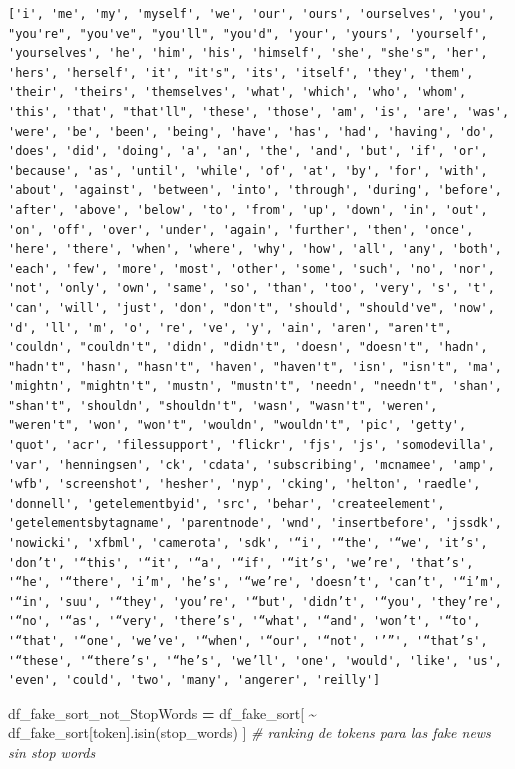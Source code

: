 \documentclass[
  11pt,
  a4paper,
]{article}
\newenvironment{Shaded}{\begin{snugshade}}{\end{snugshade}}
\newcommand{\CommentTok}[1]{\textcolor[rgb]{0.56,0.35,0.01}{\textit{#1}}}
\newcommand{\NormalTok}[1]{#1}
\newcommand{\OperatorTok}[1]{\textcolor[rgb]{0.81,0.36,0.00}{\textbf{#1}}}
\newcommand{\StringTok}[1]{\textcolor[rgb]{0.31,0.60,0.02}{#1}}
\begin{document}
\begin{verbatim}
['i', 'me', 'my', 'myself', 'we', 'our', 'ours', 'ourselves', 'you', "you're", "you've", "you'll", "you'd", 'your', 'yours', 'yourself', 'yourselves', 'he', 'him', 'his', 'himself', 'she', "she's", 'her', 'hers', 'herself', 'it', "it's", 'its', 'itself', 'they', 'them', 'their', 'theirs', 'themselves', 'what', 'which', 'who', 'whom', 'this', 'that', "that'll", 'these', 'those', 'am', 'is', 'are', 'was', 'were', 'be', 'been', 'being', 'have', 'has', 'had', 'having', 'do', 'does', 'did', 'doing', 'a', 'an', 'the', 'and', 'but', 'if', 'or', 'because', 'as', 'until', 'while', 'of', 'at', 'by', 'for', 'with', 'about', 'against', 'between', 'into', 'through', 'during', 'before', 'after', 'above', 'below', 'to', 'from', 'up', 'down', 'in', 'out', 'on', 'off', 'over', 'under', 'again', 'further', 'then', 'once', 'here', 'there', 'when', 'where', 'why', 'how', 'all', 'any', 'both', 'each', 'few', 'more', 'most', 'other', 'some', 'such', 'no', 'nor', 'not', 'only', 'own', 'same', 'so', 'than', 'too', 'very', 's', 't', 'can', 'will', 'just', 'don', "don't", 'should', "should've", 'now', 'd', 'll', 'm', 'o', 're', 've', 'y', 'ain', 'aren', "aren't", 'couldn', "couldn't", 'didn', "didn't", 'doesn', "doesn't", 'hadn', "hadn't", 'hasn', "hasn't", 'haven', "haven't", 'isn', "isn't", 'ma', 'mightn', "mightn't", 'mustn', "mustn't", 'needn', "needn't", 'shan', "shan't", 'shouldn', "shouldn't", 'wasn', "wasn't", 'weren', "weren't", 'won', "won't", 'wouldn', "wouldn't", 'pic', 'getty', 'quot', 'acr', 'filessupport', 'flickr', 'fjs', 'js', 'somodevilla', 'var', 'henningsen', 'ck', 'cdata', 'subscribing', 'mcnamee', 'amp', 'wfb', 'screenshot', 'hesher', 'nyp', 'cking', 'helton', 'raedle', 'donnell', 'getelementbyid', 'src', 'behar', 'createelement', 'getelementsbytagname', 'parentnode', 'wnd', 'insertbefore', 'jssdk', 'nowicki', 'xfbml', 'camerota', 'sdk', '“i', '“the', '“we', 'it’s', 'don’t', '“this', '“it', '“a', '“if', '“it’s', 'we’re', 'that’s', '“he', '“there', 'i’m', 'he’s', '“we’re', 'doesn’t', 'can’t', '“i’m', '“in', 'suu', '“they', 'you’re', '“but', 'didn’t', '“you', 'they’re', '“no', '“as', '“very', 'there’s', '“what', '“and', 'won’t', '“to', '“that', '“one', 'we’ve', '“when', '“our', '“not', '’”', '“that’s', '“these', '“there’s', '“he’s', 'we’ll', 'one', 'would', 'like', 'us', 'even', 'could', 'two', 'many', 'angerer', 'reilly']
\end{verbatim}

\begin{Shaded}
\begin{Highlighting}[]
\NormalTok{df\_fake\_sort\_not\_StopWords }\OperatorTok{=}\NormalTok{ df\_fake\_sort[ }\OperatorTok{\textasciitilde{}}\NormalTok{ df\_fake\_sort[}\StringTok{\textquotesingle{}token\textquotesingle{}}\NormalTok{].isin(stop\_words) ] }\CommentTok{\# ranking de tokens para las fake news sin stop words}
\end{Highlighting}
\end{Shaded}
\end{document}
